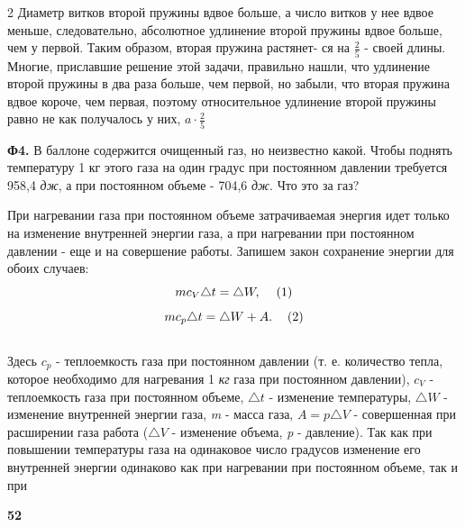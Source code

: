 \begin{multicols}{2}
    Диаметр витков второй пружины вдвое больше, а число витков у нее вдвое меньше, следовательно, абсолютное удлинение второй пружины вдвое больше, чем у первой. Таким образом, вторая пружина растянет-
    ся на $\frac{2}{5}$ - своей длины.
    Многие, приславшие решение этой задачи, правильно нашли, что удлинение второй пружины в два раза больше, чем первой, но забыли, что вторая пружина вдвое короче, чем первая, поэтому относительное удлинение второй пружины равно не
    как получалось у них, $a \cdot \frac{2}{5}$
    \par
    {\small\textbf{Ф4.} В баллоне содержится очищенный газ, но неизвестно какой. Чтобы поднять температуру 1 кг этого газа на один градус при постоянном давлении требуется 958,4 \emph{дж}, а при постоянном объеме - 704,6 \emph{дж}. Что это за газ?}
    \par
    При нагревании газа при постоянном объеме затрачиваемая энергия идет только на изменение внутренней энергии газа, а при нагревании при постоянном давлении - еще и на совершение работы. Запишем закон сохранение энергии для обоих случаев:\\
    \[mc_{V}\triangle t = \triangle W, \hspace{12px}(1)\] 
    \[mc_{p}\triangle t = \triangle W + A.\hspace{12px}(2)\]\\
    Здесь $c_{p}$ - теплоемкость газа при постоянном давлении (т. е. количество тепла, которое необходимо для нагревания 1 \emph{кг} газа при постоянном давлении), $c_{V}$ - теплоемкость газа при постоянном объеме, $\triangle t$ - изменение температуры, $\triangle W$ - изменение внутренней энергии газа, \emph{m} - масса газа, $A = p\triangle V$ - совершенная при расширении газа работа ($\triangle V$ - изменение объема, \emph{p} - давление).
    Так как при повышении температуры газа на одинаковое число градусов изменение его внутренней энергии одинаково как при нагревании при постоянном объеме, так и при \par\hfill {\small\textbf{52}}
\end{multicols}



